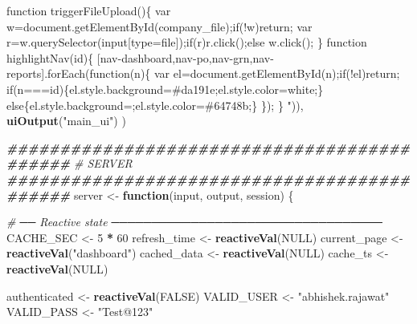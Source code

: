 \documentclass[
]{article}
\newenvironment{Shaded}{\begin{snugshade}}{\end{snugshade}}
\newcommand{\CommentTok}[1]{\textcolor[rgb]{0.56,0.35,0.01}{\textit{#1}}}
\newcommand{\ConstantTok}[1]{\textcolor[rgb]{0.56,0.35,0.01}{#1}}
\newcommand{\ControlFlowTok}[1]{\textcolor[rgb]{0.13,0.29,0.53}{\textbf{#1}}}
\newcommand{\DecValTok}[1]{\textcolor[rgb]{0.00,0.00,0.81}{#1}}
\newcommand{\DocumentationTok}[1]{\textcolor[rgb]{0.56,0.35,0.01}{\textbf{\textit{#1}}}}
\newcommand{\FunctionTok}[1]{\textcolor[rgb]{0.13,0.29,0.53}{\textbf{#1}}}
\newcommand{\NormalTok}[1]{#1}
\newcommand{\OtherTok}[1]{\textcolor[rgb]{0.56,0.35,0.01}{#1}}
\newcommand{\SpecialCharTok}[1]{\textcolor[rgb]{0.81,0.36,0.00}{\textbf{#1}}}
\newcommand{\StringTok}[1]{\textcolor[rgb]{0.31,0.60,0.02}{#1}}
\begin{document}
\begin{Shaded}
\begin{Highlighting}[]
\StringTok{    function triggerFileUpload()\{}
\StringTok{      var w=document.getElementById(\textquotesingle{}company\_file\textquotesingle{});if(!w)return;}
\StringTok{      var r=w.querySelector(\textquotesingle{}input[type=file]\textquotesingle{});if(r)r.click();else w.click();}
\StringTok{    \}}
\StringTok{    function highlightNav(id)\{}
\StringTok{      [\textquotesingle{}nav{-}dashboard\textquotesingle{},\textquotesingle{}nav{-}po\textquotesingle{},\textquotesingle{}nav{-}grn\textquotesingle{},\textquotesingle{}nav{-}reports\textquotesingle{}].forEach(function(n)\{}
\StringTok{        var el=document.getElementById(n);if(!el)return;}
\StringTok{        if(n===id)\{el.style.background=\textquotesingle{}\#da191e\textquotesingle{};el.style.color=\textquotesingle{}white\textquotesingle{};\}}
\StringTok{        else\{el.style.background=\textquotesingle{}\textquotesingle{};el.style.color=\textquotesingle{}\#64748b\textquotesingle{};\}}
\StringTok{      \});}
\StringTok{    \}}
\StringTok{  "}\NormalTok{)),}
  \FunctionTok{uiOutput}\NormalTok{(}\StringTok{"main\_ui"}\NormalTok{)}
\NormalTok{)}

\DocumentationTok{\#\#\#\#\#\#\#\#\#\#\#\#\#\#\#\#\#\#\#\#\#\#\#\#\#\#\#\#\#\#\#\#\#\#\#\#\#\#\#\#\#\#\#\#}
\CommentTok{\# SERVER}
\DocumentationTok{\#\#\#\#\#\#\#\#\#\#\#\#\#\#\#\#\#\#\#\#\#\#\#\#\#\#\#\#\#\#\#\#\#\#\#\#\#\#\#\#\#\#\#\#}
\NormalTok{server }\OtherTok{\textless{}{-}} \ControlFlowTok{function}\NormalTok{(input, output, session) \{}
  
  \CommentTok{\# ── Reactive state ──────────────────────────────────}
\NormalTok{  CACHE\_SEC    }\OtherTok{\textless{}{-}} \DecValTok{5} \SpecialCharTok{*} \DecValTok{60}
\NormalTok{  refresh\_time }\OtherTok{\textless{}{-}} \FunctionTok{reactiveVal}\NormalTok{(}\ConstantTok{NULL}\NormalTok{)}
\NormalTok{  current\_page }\OtherTok{\textless{}{-}} \FunctionTok{reactiveVal}\NormalTok{(}\StringTok{"dashboard"}\NormalTok{)}
\NormalTok{  cached\_data  }\OtherTok{\textless{}{-}} \FunctionTok{reactiveVal}\NormalTok{(}\ConstantTok{NULL}\NormalTok{)}
\NormalTok{  cache\_ts     }\OtherTok{\textless{}{-}} \FunctionTok{reactiveVal}\NormalTok{(}\ConstantTok{NULL}\NormalTok{)}
  
\NormalTok{  authenticated }\OtherTok{\textless{}{-}} \FunctionTok{reactiveVal}\NormalTok{(}\ConstantTok{FALSE}\NormalTok{)}
\NormalTok{  VALID\_USER    }\OtherTok{\textless{}{-}} \StringTok{"abhishek.rajawat"}
\NormalTok{  VALID\_PASS    }\OtherTok{\textless{}{-}} \StringTok{"Test@123"}
  

\end{Highlighting}
\end{Shaded}
\end{document}
